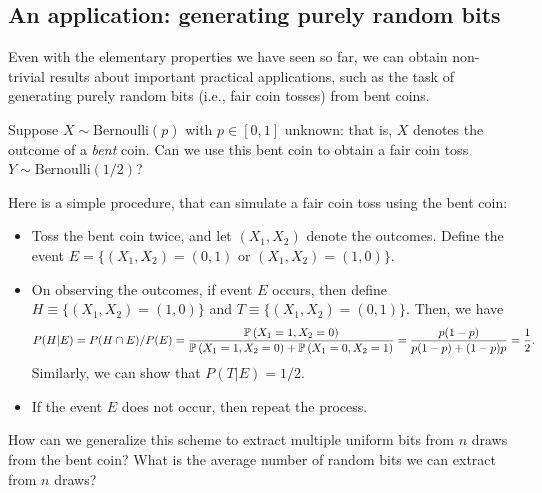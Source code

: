         \subsection{An application: generating purely random bits}
            Even with the elementary properties we have seen so far, we can obtain non-trivial results about important practical applications, such as the task of generating purely random bits (i.e., fair coin tosses) from bent coins. 
            \begin{question}
                \label{question:radom-bits} Suppose $X \sim \text{Bernoulli}(p)$ with $p \in [0,1]$ unknown:  that is, $X$ denotes the outcome of a \emph{bent} coin. Can we use this bent coin to obtain a fair coin toss $Y \sim \text{Bernoulli}(1/2)$? 
            \end{question}
            Here is a simple procedure, that can simulate a fair coin toss using the bent coin: 
            \begin{itemize}
                \item Toss the bent coin twice, and let $(X_1, X_2)$ denote the outcomes. 
                Define the event $E = \{ (X_1, X_2) = (0, 1) \text{ or } (X_1, X_2) = (1, 0)\}$. 

                \item On observing the outcomes, if event $E$ occurs, then define $H \equiv \{(X_1, X_2) = (1, 0)\}$ and $T \equiv \{(X_1, X_2) = (0, 1)\}$. Then, we have 
                \begin{align}
                    P(H|E) = P(H \cap E)/P(E) = \frac{\mathbb{P}\left( X_1 = 1, X_2 = 0\right)}{\mathbb{P}\left( X_1 = 1, X_2 = 0\right) + \mathbb{P}\left( X_1 = 0, X_2 = 1\right)}  = \frac{p(1-p)}{p(1-p) + (1-p)p} = \frac{1}{2}. 
                \end{align}
                Similarly, we can show that $P(T|E) = 1/2$. 
                \item If the event $E$ does not occur, then repeat the process. 
            \end{itemize}

            \begin{question}
                \label{question:random-bits-2} How can we generalize this scheme to extract multiple uniform bits from $n$ \iid draws from the bent coin? What is the average number of random bits we can extract from $n$ \iid draws? 
            \end{question}            

